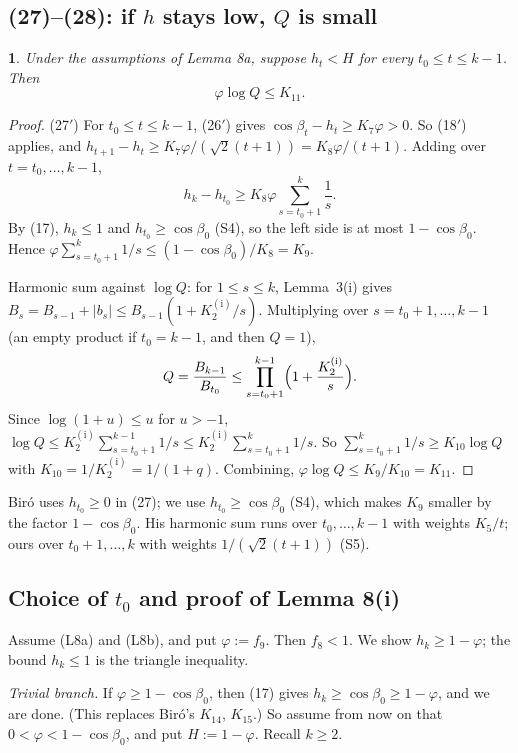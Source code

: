 \documentclass[11pt]{amsart}
\theoremstyle{remark}
\theoremstyle{plain}
\newtheorem*{namedthm*}{\protect\mythmname}
\newcommand{\mythmname}{}
\newenvironment{named}[1]{\renewcommand{\mythmname}{#1}\begin{namedthm*}}{\end{namedthm*}}
\newcommand{\abs}[1]{\lvert #1\rvert}
\newcommand{\Kb}{K_2^{(\mathrm{i})}}
\begin{document}
\subsection{(27)--(28): if \texorpdfstring{$h$}{h} stays low, \texorpdfstring{$Q$}{Q} is small}\label{app:27}
\begin{named}{Lemma 8b}
Under the assumptions of Lemma 8a, suppose $h_t<H$ for every $t_0\le t\le k-1$. Then
\begin{equation}\tag{28$'$}
\varphi\log Q\le K_{11}.
\end{equation}
\end{named}
\begin{proof}
(27$'$) For $t_0\le t\le k-1$, (26$'$) gives $\cos\beta_t-h_t\ge K_7\varphi>0$. So (18$'$) applies, and $h_{t+1}-h_t\ge K_7\varphi/(\sqrt2(t+1))=K_8\varphi/(t+1)$. Adding over $t=t_0,\dots,k-1$,
\[
h_k-h_{t_0}\ge K_8\varphi\sum_{s=t_0+1}^k\frac1s .
\]
By (17), $h_k\le1$ and $h_{t_0}\ge\cos\beta_0$ (S4), so the left side is at most $1-\cos\beta_0$. Hence $\varphi\sum_{s=t_0+1}^k1/s\le(1-\cos\beta_0)/K_8=K_9$.

Harmonic sum against $\log Q$: for $1\le s\le k$, Lemma~3(i) gives $B_s=B_{s-1}+\abs{b_s}\le B_{s-1}(1+\Kb/s)$. Multiplying over $s=t_0+1,\dots,k-1$ (an empty product if $t_0=k-1$, and then $Q=1$),
\[
Q=\frac{B_{k-1}}{B_{t_0}}\le\prod_{s=t_0+1}^{k-1}\Bigl(1+\frac{\Kb}s\Bigr).
\]
Since $\log(1+u)\le u$ for $u>-1$, $\log Q\le\Kb\sum_{s=t_0+1}^{k-1}1/s\le\Kb\sum_{s=t_0+1}^k1/s$. So $\sum_{s=t_0+1}^k1/s\ge K_{10}\log Q$ with $K_{10}=1/\Kb=1/(1+q)$. Combining, $\varphi\log Q\le K_9/K_{10}=K_{11}$.
\end{proof}
Bir\'o uses $h_{t_0}\ge0$ in (27); we use $h_{t_0}\ge\cos\beta_0$ (S4), which makes $K_9$ smaller by the factor $1-\cos\beta_0$. His harmonic sum runs over $t_0,\dots,k-1$ with weights $K_5/t$; ours over $t_0+1,\dots,k$ with weights $1/(\sqrt2(t+1))$ (S5).

\subsection{Choice of \texorpdfstring{$t_0$}{t0} and proof of Lemma 8(i)}\label{app:t0}
Assume (L8a) and (L8b), and put $\varphi:=f_9$. Then $f_8<1$. We show $h_k\ge1-\varphi$; the bound $h_k\le1$ is the triangle inequality.

\emph{Trivial branch.} If $\varphi\ge1-\cos\beta_0$, then (17) gives $h_k\ge\cos\beta_0\ge1-\varphi$, and we are done. (This replaces Bir\'o's $K_{14}$, $K_{15}$.) So assume from now on that $0<\varphi<1-\cos\beta_0$, and put $H:=1-\varphi$. Recall $k\ge2$.
\end{document}
